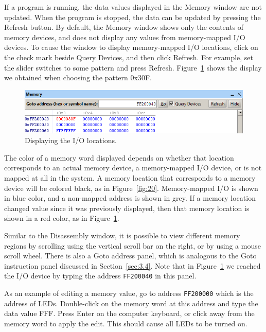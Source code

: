 \documentclass[11pt, twoside, pdftex]{article}
\begin{document}
If a program is running, the data values displayed in the
Memory window are not updated. When the program is stopped,
the data can be updated by pressing the {\sf Refresh} button. 
By default, the Memory window shows only the contents of memory
devices, and does not display any values from memory-mapped I/O devices. To cause the window to display memory-mapped
I/O locations, click on the check mark beside 
{\sf Query Devices}, and then click 
{\sf Refresh}. For example, set the slider switches to some
pattern and press {\sf Refresh}. Figure~\ref{fig:21} shows the display we
obtained when choosing the pattern 0x30F.

\begin{figure}[H]
   \begin{center}
      \includegraphics[scale=1]{screenshots/figure21.png}
   \end{center}
   \caption{Displaying the I/O locations.}
	 \label{fig:21}
\end{figure}
 

The color of a memory word displayed depends on whether that
location corresponds to an actual memory device, a memory-mapped
I/O device, or is not mapped at all in the system. 
A memory location that corresponds to a memory device will be 
colored black, as in Figure~\ref{fig:20}. Memory-mapped I/O is shown in
blue color, and a non-mapped address is
shown in grey. If a memory location changed value since it was previously displayed, then
that memory location is shown in a red color, as in Figure~\ref{fig:21}.

Similar to the Disassembly window, it is possible to view
different memory regions by scrolling using the vertical scroll
bar on the right, or by using a mouse scroll wheel.
There is also a \textsf{Goto address} panel, which is
analogous to the \textsf{Goto instruction} panel discussed in Section~\ref{sec:3.4}. Note that in Figure~\ref{fig:21} we reached the I/O device
by typing the address \texttt{FF200040} in this panel.
  
As an example of editing a memory value, go to address
\texttt{FF200000} which is the address of LEDs.
Double-click on the memory word at this address 
and type the data value FFF. Press \textsf{Enter} on
the computer keyboard, or click away from the memory word to
apply the edit. This should cause all LEDs to be turned on. 
\end{document}
